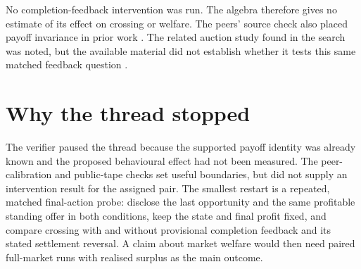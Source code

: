\documentclass{article}
\begin{document}
No completion-feedback intervention was run. The algebra therefore gives no estimate of its effect on
crossing or welfare. The peers' source check also placed payoff invariance in prior work
\cite{devlin2011,lu2011}. The related auction study found in the search was noted, but the available
material did not establish whether it tests this same matched feedback question \cite{related2025}.

\section{Why the thread stopped}

The verifier paused the thread because the supported payoff identity was already known and the proposed
behavioural effect had not been measured. The peer-calibration and public-tape checks set useful
boundaries, but did not supply an intervention result for the assigned pair. The smallest restart is a
repeated, matched final-action probe: disclose the last opportunity and the same profitable standing
offer in both conditions, keep the state and final profit fixed, and compare crossing with and without
provisional completion feedback and its stated settlement reversal. A claim about market welfare would
then need paired full-market runs with realised surplus as the main outcome.



\end{document}
